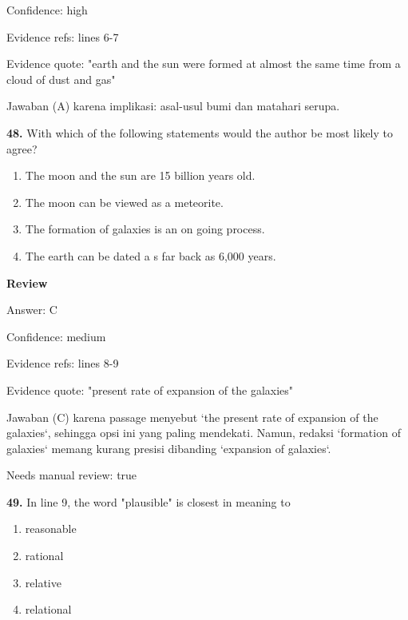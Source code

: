\documentclass[12pt]{article}
\begin{document}
Confidence: high\par
Evidence refs: lines 6-7\par
Evidence quote: "earth and the sun were formed at almost the same time from a cloud of dust and gas"\par
Jawaban (A) karena implikasi: asal-usul bumi dan matahari serupa.\par
\endgroup
\par
\vspace{0.25\baselineskip}
\noindent\textbf{48.} With which of the following statements would the author be most likely to agree?
\begin{enumerate}[label=(\Alph*),leftmargin=*,itemsep=0.2em]
\item The moon and the sun are 15 billion years old.
\item The moon can be viewed as a meteorite.
\item The formation of galaxies is an on going process.
\item The earth can be dated a s far back as 6,000 years.
\end{enumerate}
\par
\begingroup
\setlength{\parskip}{0pt}
\setlength{\parindent}{0pt}
\textbf{Review}\par
Answer: C\par
Confidence: medium\par
Evidence refs: lines 8-9\par
Evidence quote: "present rate of expansion of the galaxies"\par
Jawaban (C) karena passage menyebut `the present rate of expansion of the galaxies`, sehingga opsi ini yang paling mendekati. Namun, redaksi `formation of galaxies` memang kurang presisi dibanding `expansion of galaxies`.\par
Needs manual review: true\par
\endgroup
\par
\vspace{0.25\baselineskip}
\noindent\textbf{49.} In line 9, the word "plausible" is closest in meaning to
\begin{enumerate}[label=(\Alph*),leftmargin=*,itemsep=0.2em]
\item reasonable
\item rational
\item relative
\item relational
\end{enumerate}
\par
\begingroup
\setlength{\parskip}{0pt}
\end{document}
